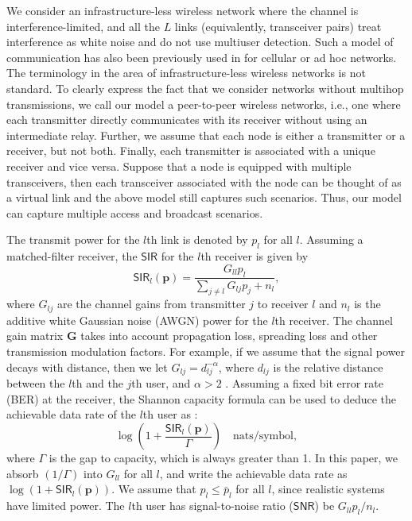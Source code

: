 \documentclass[10pt,twocolumn]{IEEEtran}
\newcommand{\0}{\mathbf{0}}
\newcommand{\1}{\mathbf{1}}
\begin{document}
We consider an infrastructure-less wireless network where the channel is interference-limited, and all the $L$ links (equivalently, transceiver pairs) treat interference as white noise and do not use multiuser detection. 
Such a model of communication has also been previously used in \cite{Tan05,Chiang05,Charafeddine07,Gesbert07,Franceschetti07,Agarwal04} for cellular or ad hoc networks. The terminology in the area of infrastructure-less wireless networks is not standard. To clearly express the fact that we consider networks without multihop transmissions, we call our model a peer-to-peer wireless networks, i.e., one where each transmitter directly communicates with its receiver without using an intermediate relay. Further, we assume that each node is either a transmitter or a receiver, but not both. Finally, each transmitter is associated with a unique receiver and vice versa. Suppose that a node is equipped with multiple transceivers, then each transceiver associated with the node can be thought of as a virtual link and the above model still captures such scenarios. Thus, our model can capture multiple access and broadcast scenarios.

The transmit power for the $l$th link is denoted by $p_l$ for all $l$. Assuming a
matched-filter receiver, the $\mathsf{SIR}$ for the $l$th receiver is given by
\begin{equation}
\label{sir} \mathsf{SIR}_{l}(\mathbf{p})=\frac{G_{ll}p_{l}}{\displaystyle \sum_{j\neq
l} G_{lj}p_{j}+n_{l}},
\end{equation}
where $G_{lj}$ are the channel gains from transmitter $j$ to
receiver $l$ and $n_l$ is the additive white Gaussian noise (AWGN)
power for the $l$th receiver. The channel gain matrix $\mathbf{G}$ takes into account propagation loss, spreading loss and other transmission modulation factors. For example, if we assume that the signal power decays with distance, then we let $G_{lj}=d^{-\alpha}_{lj}$, where $d_{lj}$ is the relative distance between the $l$th and the $j$th user, and $\alpha > 2$ \cite{Chiang05,Agarwal04}. Assuming a fixed bit error rate (BER) at the receiver, the Shannon capacity formula can be used to deduce the achievable data rate of the $l$th user as \cite{Cover91}:
\begin{equation}
\label{thruput}
\log \left(1+\frac{\mathsf{SIR}_{l}(\mathbf{p})}{\Gamma} \right) \quad \mbox{nats/symbol},
\end{equation}
where $\Gamma$ is the gap to capacity, which is always greater than 1. In this paper, we absorb $(1/\Gamma)$ into $G_{ll}$ for all $l$, and write the achievable data rate as $\log (1+\mathsf{SIR}_{l}(\mathbf{p}))$. We assume that $p_l \le \bar{p}_l$ for all $l$, since realistic systems have limited power. The $l$th user has signal-to-noise ratio ($\mathsf{SNR}$) be $G_{ll}p_l/n_l$.
\end{document}
